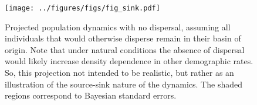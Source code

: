 \documentclass[11pt]{article}
\begin{document}
\clearpage
\begin{figure}
\centering
\texttt{[image: ../figures/figs/fig\_sink.pdf]}
\caption{\label{fig:sink}
Projected population dynamics with no dispersal,
assuming all individuals that would otherwise disperse remain 
in their basin of origin.
Note that under natural conditions the absence of dispersal 
would likely increase density dependence in other demographic rates.
So, this projection not intended to be realistic, 
but rather as an illustration of the source-sink nature of the dynamics.
The shaded regions correspond to Bayesian standard errors.
}
\end{figure}
\clearpage

\renewcommand{\thefigure}{A\arabic{figure}}
\renewcommand{\theequation}{A\arabic{equation}}
\renewcommand{\thetable}{A\arabic{table}}
\setcounter{equation}{0}
\setcounter{figure}{0}
\setcounter{table}{0}


\end{document}

